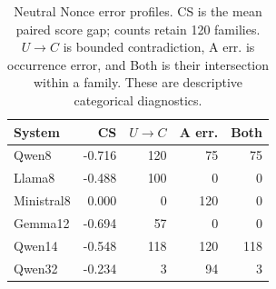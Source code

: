 \begin{table}[t]
\centering
\caption{Neutral Nonce error profiles. CS is the mean paired score gap; counts retain 120 families. $U\!\to\!C$ is bounded contradiction, A err. is occurrence error, and Both is their intersection within a family. These are descriptive categorical diagnostics.}
\label{tab:profile}
\setlength{\tabcolsep}{4pt}
\begin{tabular}{lrrrr}
\toprule
System & CS & $U\!\to\!C$ & A err. & Both\\
\midrule
Qwen8 & -0.716 & 120 & 75 & 75 \\
Llama8 & -0.488 & 100 & 0 & 0 \\
Ministral8 & 0.000 & 0 & 120 & 0 \\
Gemma12 & -0.694 & 57 & 0 & 0 \\
Qwen14 & -0.548 & 118 & 120 & 118 \\
Qwen32 & -0.234 & 3 & 94 & 3 \\
\bottomrule
\end{tabular}
\end{table}
